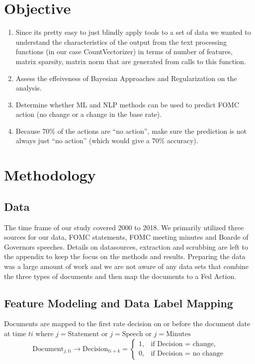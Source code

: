 \documentclass[11pt]{article}
\begin{document}
{\section{Objective}
\begin{enumerate}
\item Since its pretty easy to just blindly apply tools to a set of data we wanted to understand the 
characteristics of the output from the text processing functions (in our case CountVectorizer) in terms of number of features, matrix sparsity, matrix norm
that are generated from calls to this function.
\item Assess the effeiveness of Bayesian Approaches and Regularization on the analysis.
\item Determine whether ML and NLP methods can be used to predict FOMC action (no change or a change in the base rate).
\item Because 70$\%$ of the actions are ``no action'', make sure the prediction is not always just ``no action'' (which would give a 70$\%$ accuracy).
\end{enumerate}

\section{Methodology}

\subsection{Data}

The time frame of our study covered 2000 to 2018. 
We primarily utilized three sources for our data, FOMC statements, FOMC meeting minutes and Boarde of Governors speeches.
Details on datasources, extraction and scrubbing are left to the appendix to keep the focus on the methods and results.
Preparing the data was a large amount of work and we are not aware of any data sets that combine the three types of documents
and then map the documents to a Fed Action.

\subsection{Feature Modeling and Data Label Mapping}
\noindent Documents are mapped to the first rate decision on or before the document date at time $ti$
where $j=\text{Statement}$ or $j=\text{Speech}$ or $j=\text{Minutes}$
\begin{equation*}
\mbox{Document}_{j,ti} \rightarrow \mbox{Decision}_{ti+k}
 = \begin{cases}
  1, & \text{if  Decision = change}, \\
  0, & \text{if  Decision = no change}
\end{cases}
\end{equation*}

}
\end{document}
